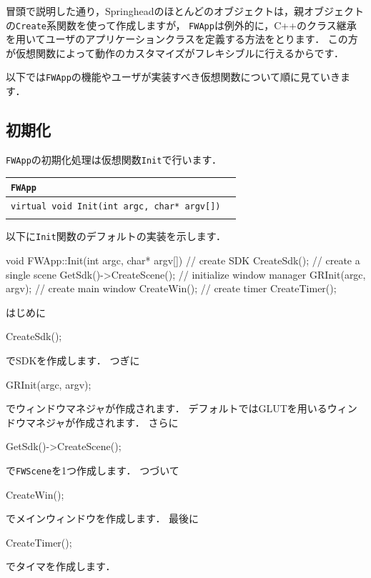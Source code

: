 \KLUDGE 冒頭で説明した通り，Springhead\KLUDGE のほとんどのオブジェクトは，親オブジェクトの\texttt{Create}\KLUDGE 系関数を使って作成しますが，
\texttt{FWApp}\KLUDGE は例外的に，C++\KLUDGE のクラス継承を用いてユーザのアプリケーションクラスを定義する方法をとります．
\KLUDGE この方が仮想関数によって動作のカスタマイズがフレキシブルに行えるからです．

\KLUDGE 以下では\texttt{FWApp}\KLUDGE の機能やユーザが実装すべき仮想関数について順に見ていきます．

\subsection*{\KLUDGE 初期化}

\texttt{FWApp}\KLUDGE の初期化処理は仮想関数\texttt{Init}\KLUDGE で行います．

\noindent
\begin{tabular}{p{.7\hsize}p{.2\hsize}}
\\
\texttt{FWApp}											\\ \midrule
\texttt{virtual void Init(int argc, char* argv[])}	&	\\
\\
\end{tabular}

\KLUDGE 以下に\texttt{Init}\KLUDGE 関数のデフォルトの実装を示します．

\begin{sourcecode}
void FWApp::Init(int argc, char* argv[]){
    // create SDK
    CreateSdk();
    // create a single scene
    GetSdk()->CreateScene();
    // initialize window manager
    GRInit(argc, argv);
    // create main window
    CreateWin();
    // create timer
    CreateTimer();
}
\end{sourcecode}
\KLUDGE はじめに
\begin{sourcecode}
    CreateSdk();
\end{sourcecode}
\KLUDGE でSDK\KLUDGE を作成します．
\KLUDGE つぎに
\begin{sourcecode}
    GRInit(argc, argv);
\end{sourcecode}
\KLUDGE でウィンドウマネジャが作成されます．
\KLUDGE デフォルトではGLUT\KLUDGE を用いるウィンドウマネジャが作成されます．
\KLUDGE さらに
\begin{sourcecode}
    GetSdk()->CreateScene();
\end{sourcecode}
\KLUDGE で\texttt{FWScene}\KLUDGE を1\KLUDGE つ作成します．
\KLUDGE つづいて
\begin{sourcecode}
    CreateWin();
\end{sourcecode}
\KLUDGE でメインウィンドウを作成します．
\KLUDGE 最後に
\begin{sourcecode}
    CreateTimer();
\end{sourcecode}
\KLUDGE でタイマを作成します．

